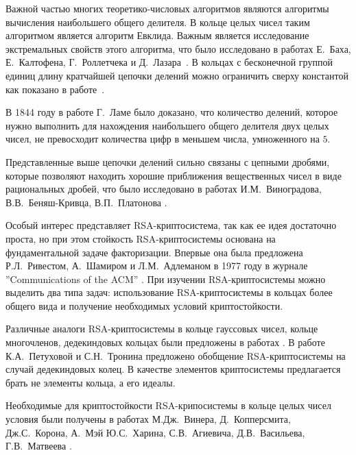 \documentclass[_00_dissertation.tex]{subfiles}
\begin{document}
Важной частью многих теоретико-числовых алгоритмов являются алгоритмы вычисления наибольшего общего делителя.
В кольце целых чисел таким алгоритмом является алгоритм Евклида.
Важным является исследование экстремальных свойств этого алгоритма, что было исследовано в работах Е.~Баха, Е.~Калтофена, Г.~Роллетчека и Д.~Лазара~\cite{source:Bach_Algorithmic_number_theory, source:Kaltofen, source:Rolletschek_1986, source:Rolletschek_1990, source:Lazard}.
В кольцах с бесконечной группой единиц длину кратчайшей цепочки делений можно ограничить сверху константой как показано в работе~\cite{source:Cooke}.

В 1844 году в работе Г.~Ламе было доказано, что количество делений, которое нужно выполнить для нахождения наибольшего общего делителя двух целых чисел, не превосходит количества цифр в меньшем числа, умноженного на $5$.

Представленные выше цепочки делений сильно связаны с цепными дробями, которые позволяют находить хорошие приближения вещественных чисел в виде рациональных дробей, что было исследовано в работах И.М.~Виноградова,  В.В.~Беняш-Кривца, В.П.~Платонова \cite{source:Vinogradov, source:Benyash-Krivets_1, source:Benyash-Krivets_2}.

Особый интерес представляет RSA-криптосистема, так как ее идея достаточно проста, но при этом стойкость RSA-криптосистемы основана на фундаментальной задаче факторизации.
Впервые она была предложена Р.Л.~Ривестом, А.~Шамиром и Л.М.~Адлеманом в 1977 году в журнале ''Communications of the ACM'' \cite{source:Rivest}.
При изучении RSA-криптосистемы можно выделить два типа задач: использование RSA-криптосистемы в кольцах более общего вида и получение необходимых условий криптостойкости.

Различные аналоги RSA-криптосистемы в кольце гауссовых чисел, кольце многочленов, дедекиндовых кольцах были предложены в работах \cite{source:Li, source:El_Kassar, source:Elkamchouchi, source:Koval, source:El_Kassar}.
В работе К.А.~Петуховой и С.Н.~Тронина \cite{source:Petukhova} предложено обобщение RSA-криптосистемы на случай дедекиндовых колец.
В качестве элементов криптосистемы предлагается брать не элементы кольца, а его идеалы.

Необходимые для криптостойкости RSA-крипосистемы в кольце целых чисел условия были получены в работах М.Дж.~Винера, Д.~Копперсмита, Дж.С.~Корона, А.~Мэй Ю.С.~Харина, С.В.~Агиевича, Д.В.~Васильева, Г.В.~Матвеева \cite{source:Wiener, source:Coppersmith, source:Coron, source:Kharin, source:Matveev_2019, source:Matveev_2018}.

\onlyinsubfile{
    
}
\end{document}
